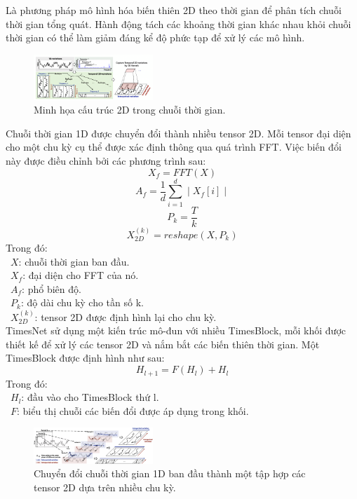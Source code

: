 Là phương pháp mô hình hóa biến thiên 2D theo thời gian để phân tích chuỗi thời gian tổng quát. Hành động tách các khoảng thời gian khác nhau khỏi chuỗi thời gian có thể làm giảm đáng kể độ phức tạp để xử lý các mô hình.

\begin{figure}[htbp]
	\centerline{\includegraphics[width=0.4\textwidth]{img/2Dstructure.png}}
	\caption{Minh họa cấu trúc 2D trong chuỗi thời gian.}
	\label{fig}
\end{figure}

Chuỗi thời gian 1D được chuyển đổi thành nhiều tensor 2D. Mỗi tensor đại diện cho một chu kỳ cụ thể được xác định thông qua quá trình FFT. Việc biến đổi này được điều chỉnh bởi các phương trình sau:
\[
X_f=FFT(X)
\]
\[
A_f=\frac{1}{d}\sum\limits_{i=1}^d\mid X_f[i]\mid
\]
\[
P_k=\frac{T}{k}
\]
\[
X_{2D}^{(k)}= reshape(X, P_k)
\]
Trong đó:\\
\indent\textbullet\ \(X\): chuỗi thời gian ban đầu.\\
\indent\textbullet\ \(X_f\): đại diện cho FFT của nó.\\
\indent\textbullet\ \(A_f\): phổ biên độ.\\
\indent\textbullet\ \(P_k\): độ dài chu kỳ cho tần số k.\\
\indent\textbullet\ \(X_{2D}^{(k)}\):  tensor 2D được định hình lại cho chu kỳ.\\

TimesNet sử dụng một kiến trúc mô-đun với nhiều TimesBlock, mỗi khối được thiết kế để xử lý các tensor 2D và nắm bắt các biến thiên thời gian. Một TimesBlock được định hình như sau:
\[
H_{l+1}=F(H_l)+H_l
\]
Trong đó:\\
\indent\textbullet\ \(H_l\): đầu vào cho TimesBlock thứ l.\\
\indent\textbullet\ \(F\): biểu thị chuỗi các biến đổi được áp dụng trong khối.

\begin{figure}[htbp]
	\centerline{\includegraphics[width=0.4\textwidth]{img/2Dtensor.png}}
	\caption{Chuyển đổi chuỗi thời gian 1D ban đầu thành một tập hợp các tensor 2D dựa trên nhiều chu kỳ.}
	\label{fig}
\end{figure}
